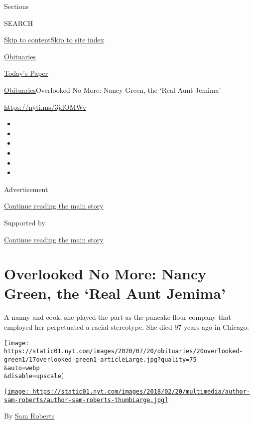 Sections

SEARCH

\protect\hyperlink{site-content}{Skip to
content}\protect\hyperlink{site-index}{Skip to site index}

\href{https://www.nytimes.com/section/obituaries}{Obituaries}

\href{https://myaccount.nytimes.com/auth/login?response_type=cookie\&client_id=vi}{}

\href{https://www.nytimes.com/section/todayspaper}{Today's Paper}

\href{/section/obituaries}{Obituaries}\textbar{}Overlooked No More:
Nancy Green, the `Real Aunt Jemima'

\url{https://nyti.ms/3jdOMWv}

\begin{itemize}
\item
\item
\item
\item
\item
\item
\end{itemize}

Advertisement

\protect\hyperlink{after-top}{Continue reading the main story}

Supported by

\protect\hyperlink{after-sponsor}{Continue reading the main story}

\hypertarget{overlooked-no-more-nancy-green-the-real-aunt-jemima}{%
\section{Overlooked No More: Nancy Green, the `Real Aunt
Jemima'}\label{overlooked-no-more-nancy-green-the-real-aunt-jemima}}

A nanny and cook, she played the part as the pancake flour company that
employed her perpetuated a racial stereotype. She died 97 years ago in
Chicago.

\texttt{[image: https://static01.nyt.com/images/2020/07/20/obituaries/20overlooked-green1/17overlooked-green1-articleLarge.jpg?quality=75\\\&auto=webp\\\&disable=upscale]}

\href{https://www.nytimes.com/by/sam-roberts}{\texttt{[image: https://static01.nyt.com/images/2018/02/20/multimedia/author-sam-roberts/author-sam-roberts-thumbLarge.jpg]}}

By \href{https://www.nytimes.com/by/sam-roberts}{Sam Roberts}

